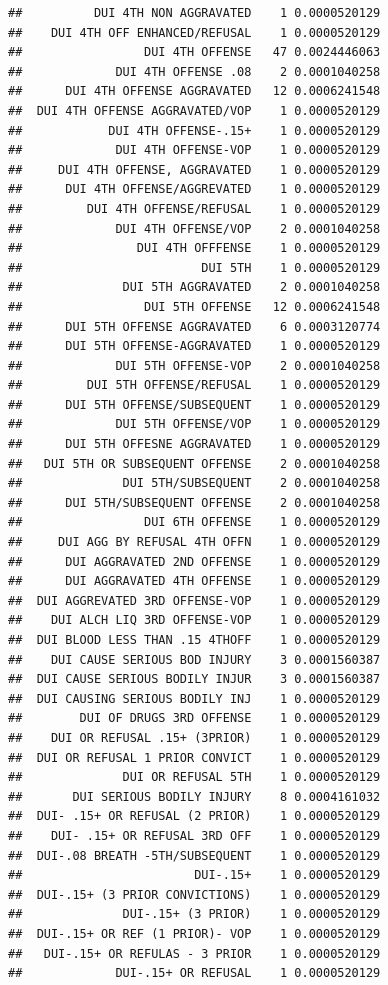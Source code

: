 \documentclass[]{book}
\begin{document}
\begin{verbatim}
##          DUI 4TH NON AGGRAVATED    1 0.0000520129
##    DUI 4TH OFF ENHANCED/REFUSAL    1 0.0000520129
##                 DUI 4TH OFFENSE   47 0.0024446063
##             DUI 4TH OFFENSE .08    2 0.0001040258
##      DUI 4TH OFFENSE AGGRAVATED   12 0.0006241548
##  DUI 4TH OFFENSE AGGRAVATED/VOP    1 0.0000520129
##            DUI 4TH OFFENSE-.15+    1 0.0000520129
##             DUI 4TH OFFENSE-VOP    1 0.0000520129
##     DUI 4TH OFFENSE, AGGRAVATED    1 0.0000520129
##      DUI 4TH OFFENSE/AGGREVATED    1 0.0000520129
##         DUI 4TH OFFENSE/REFUSAL    1 0.0000520129
##             DUI 4TH OFFENSE/VOP    2 0.0001040258
##                DUI 4TH OFFFENSE    1 0.0000520129
##                         DUI 5TH    1 0.0000520129
##              DUI 5TH AGGRAVATED    2 0.0001040258
##                 DUI 5TH OFFENSE   12 0.0006241548
##      DUI 5TH OFFENSE AGGRAVATED    6 0.0003120774
##      DUI 5TH OFFENSE-AGGRAVATED    1 0.0000520129
##             DUI 5TH OFFENSE-VOP    2 0.0001040258
##         DUI 5TH OFFENSE/REFUSAL    1 0.0000520129
##      DUI 5TH OFFENSE/SUBSEQUENT    1 0.0000520129
##             DUI 5TH OFFENSE/VOP    1 0.0000520129
##      DUI 5TH OFFESNE AGGRAVATED    1 0.0000520129
##   DUI 5TH OR SUBSEQUENT OFFENSE    2 0.0001040258
##              DUI 5TH/SUBSEQUENT    2 0.0001040258
##      DUI 5TH/SUBSEQUENT OFFENSE    2 0.0001040258
##                 DUI 6TH OFFENSE    1 0.0000520129
##     DUI AGG BY REFUSAL 4TH OFFN    1 0.0000520129
##      DUI AGGRAVATED 2ND OFFENSE    1 0.0000520129
##      DUI AGGRAVATED 4TH OFFENSE    1 0.0000520129
##  DUI AGGREVATED 3RD OFFENSE-VOP    1 0.0000520129
##    DUI ALCH LIQ 3RD OFFENSE-VOP    1 0.0000520129
##  DUI BLOOD LESS THAN .15 4THOFF    1 0.0000520129
##    DUI CAUSE SERIOUS BOD INJURY    3 0.0001560387
##  DUI CAUSE SERIOUS BODILY INJUR    3 0.0001560387
##  DUI CAUSING SERIOUS BODILY INJ    1 0.0000520129
##        DUI OF DRUGS 3RD OFFENSE    1 0.0000520129
##    DUI OR REFUSAL .15+ (3PRIOR)    1 0.0000520129
##  DUI OR REFUSAL 1 PRIOR CONVICT    1 0.0000520129
##              DUI OR REFUSAL 5TH    1 0.0000520129
##       DUI SERIOUS BODILY INJURY    8 0.0004161032
##  DUI- .15+ OR REFUSAL (2 PRIOR)    1 0.0000520129
##    DUI- .15+ OR REFUSAL 3RD OFF    1 0.0000520129
##  DUI-.08 BREATH -5TH/SUBSEQUENT    1 0.0000520129
##                        DUI-.15+    1 0.0000520129
##  DUI-.15+ (3 PRIOR CONVICTIONS)    1 0.0000520129
##              DUI-.15+ (3 PRIOR)    1 0.0000520129
##  DUI-.15+ OR REF (1 PRIOR)- VOP    1 0.0000520129
##   DUI-.15+ OR REFULAS - 3 PRIOR    1 0.0000520129
##             DUI-.15+ OR REFUSAL    1 0.0000520129

\end{verbatim}
\end{document}
